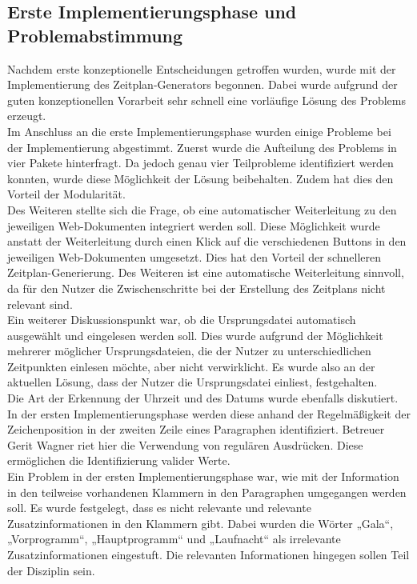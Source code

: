 \subsection{Erste Implementierungsphase und Problemabstimmung}
Nachdem erste konzeptionelle Entscheidungen getroffen wurden, wurde mit der Implementierung des Zeitplan-Generators begonnen. Dabei wurde aufgrund der guten konzeptionellen Vorarbeit sehr schnell eine vorläufige Lösung des Problems erzeugt.\\
Im Anschluss an die erste Implementierungsphase wurden einige Probleme bei der Implementierung abgestimmt. Zuerst wurde die Aufteilung des Problems in vier Pakete hinterfragt. Da jedoch genau vier Teilprobleme identifiziert werden konnten, wurde diese Möglichkeit der Lösung beibehalten. Zudem hat dies den Vorteil der Modularität.\\
Des Weiteren stellte sich die Frage, ob eine automatischer Weiterleitung zu den jeweiligen Web-Dokumenten integriert werden soll. Diese Möglichkeit wurde anstatt der Weiterleitung durch einen Klick auf die verschiedenen Buttons in den jeweiligen Web-Dokumenten umgesetzt. Dies hat den Vorteil der schnelleren Zeitplan-Generierung. Des Weiteren ist eine automatische Weiterleitung sinnvoll, da für den Nutzer die Zwischenschritte bei der Erstellung des Zeitplans nicht relevant sind. \\
Ein weiterer Diskussionspunkt war, ob die Ursprungsdatei automatisch ausgewählt und eingelesen werden soll. Dies wurde aufgrund der Möglichkeit mehrerer möglicher Ursprungsdateien, die der Nutzer zu unterschiedlichen Zeitpunkten einlesen möchte, aber nicht verwirklicht. Es wurde also an der aktuellen Lösung, dass der Nutzer die Ursprungsdatei einliest, festgehalten.\\
Die Art der Erkennung der Uhrzeit und des Datums wurde ebenfalls diskutiert. In der ersten Implementierungsphase werden diese anhand der Regelmäßigkeit der Zeichenposition in der zweiten Zeile eines Paragraphen identifiziert. Betreuer Gerit Wagner riet hier die Verwendung von regulären Ausdrücken. Diese ermöglichen die Identifizierung valider Werte.\\
Ein Problem in der ersten Implementierungsphase war, wie mit der Information in den teilweise vorhandenen Klammern in den Paragraphen umgegangen werden soll. Es wurde festgelegt, dass es nicht relevante und relevante Zusatzinformationen in den Klammern gibt. Dabei wurden die Wörter „Gala“, „Vorprogramm“, „Hauptprogramm“ und „Laufnacht“ als irrelevante Zusatzinformationen eingestuft. Die relevanten Informationen hingegen sollen Teil der Disziplin sein.\\

